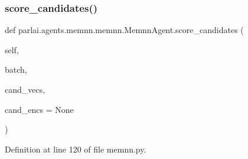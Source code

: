 \subsubsection{\texorpdfstring{score\+\_\+candidates()}{score\_candidates()}}
{\footnotesize\ttfamily def parlai.\+agents.\+memnn.\+memnn.\+Memnn\+Agent.\+score\+\_\+candidates (\begin{DoxyParamCaption}\item[{}]{self,  }\item[{}]{batch,  }\item[{}]{cand\+\_\+vecs,  }\item[{}]{cand\+\_\+encs = {\ttfamily None} }\end{DoxyParamCaption})}



Definition at line 120 of file memnn.\+py.



